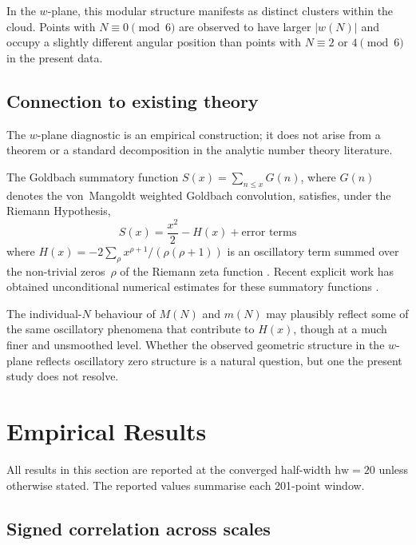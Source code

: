 \documentclass[11pt,a4paper]{article}
\newcommand{\MN}{M(N)}
\newcommand{\mN}{m(N)}
\newcommand{\wN}{w(N)}
\begin{document}
In the $w$-plane, this modular structure manifests as distinct clusters within the cloud. Points with $N \equiv 0 \pmod{6}$ are observed to have larger $|\wN|$ and occupy a slightly different angular position than points with $N \equiv 2$ or $4 \pmod{6}$ in the present data.


\subsection{Connection to existing theory}

The $w$-plane diagnostic is an empirical construction; it does not arise from a theorem or a standard decomposition in the analytic number theory literature.

The Goldbach summatory function $S(x) = \sum_{n \leq x} G(n)$, where $G(n)$ denotes the von~Mangoldt weighted Goldbach convolution, satisfies, under the Riemann Hypothesis,
\begin{equation}
S(x) = \frac{x^2}{2} - H(x) + \text{error terms}
\end{equation}
where $H(x) = -2\sum_\rho x^{\rho+1}/(\rho(\rho+1))$ is an oscillatory term summed over the non-trivial zeros~$\rho$ of the Riemann zeta function \citep{Fujii1991, Granville2007, BhowmikHalupczok2018}. Recent explicit work has obtained unconditional numerical estimates for these summatory functions \citep{BhowmikErnvallPalojarvi2025}.

The individual-$N$ behaviour of $\MN$ and $\mN$ may plausibly reflect some of the same oscillatory phenomena that contribute to $H(x)$, though at a much finer and unsmoothed level. Whether the observed geometric structure in the $w$-plane reflects oscillatory zero structure is a natural question, but one the present study does not resolve.



\section{Empirical Results}

All results in this section are reported at the converged half-width $\mathrm{hw} = 20$ unless otherwise stated. The reported values summarise each 201-point window.

\subsection{Signed correlation across scales}
\end{document}
